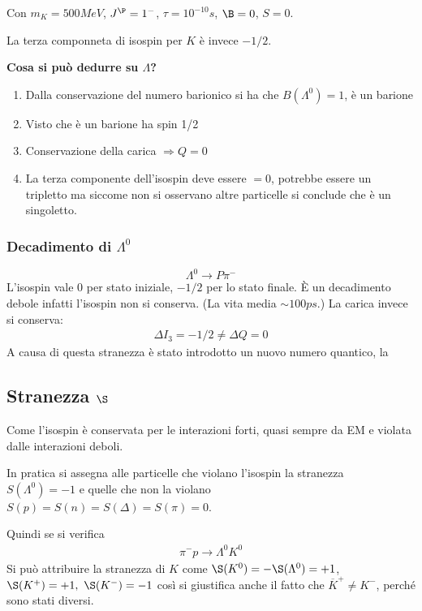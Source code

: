 \documentclass[12pt]{book}
\begin{document}
Con $m_K=500MeV$, $J^\P =1^-$, $\tau=10^{-10}s$, $\B =0$, $S=0$.

La terza componneta di isospin per $K$ è invece $-1/2$.

\noindent \textbf{Cosa si può dedurre su $\Lambda$?} 
\begin{enumerate}
	\item Dalla conservazione del numero barionico si ha che $B( \Lambda^0)=1$, è un barione 
	\item Visto che è un barione ha spin 1/2
	\item Conservazione della carica $\Rightarrow Q=0$
	\item La terza componente dell'isospin deve essere $=0$, potrebbe essere un tripletto ma siccome non si osservano altre particelle si conclude che è un singoletto.
\end{enumerate}

\subsubsection{Decadimento di $\Lambda^0$}
\begin{equation}
	\Lambda^0 \rightarrow P \pi^-
\end{equation}
L'isospin vale $0$ per stato iniziale, $-1/2$ per lo stato finale. È un decadimento debole infatti l'isospin non si conserva. (La vita media $\sim 100 ps$.) La carica invece si conserva:
\begin{gather}
	\Delta I_3 = -1/2 \neq \Delta Q=0
\end{gather}
A causa di questa stranezza è stato introdotto un nuovo numero quantico, la

\subsection{Stranezza $\S$}
Come l'isospin è conservata per le interazioni forti, quasi sempre da EM e violata dalle interazioni deboli.

In pratica si assegna alle particelle che violano l'isospin la stranezza $S(\Lambda^0)=-1$ e quelle che non la violano $S(p)=S(n)=S(\Delta) = S(\pi) =0$.

Quindi se si verifica
\begin{gather}
	\pi^- p \rightarrow \Lambda ^0 K^0
\end{gather}
Si può attribuire la stranezza di $K$ come $\S(K^0) = -\S(\Lambda^0)=+1$, $\S(K^+)=+1, \ \S(K^-)=-1$ così si giustifica anche il fatto che $\overline K^+ \neq K^-$, perché sono stati diversi.
\end{document}
